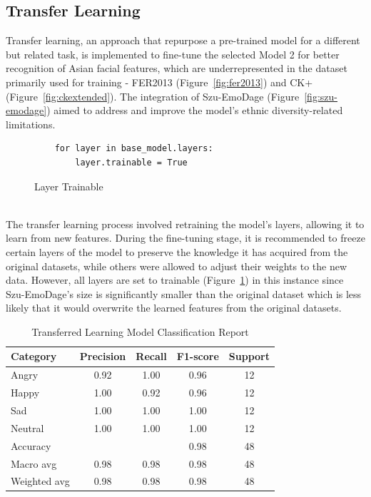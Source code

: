 \subsection{Transfer Learning}
Transfer learning, an approach that repurpose a pre-trained model for a different but related task, is implemented to fine-tune the selected Model 2 for better recognition of Asian facial features, which are underrepresented in the dataset primarily used for training - FER2013 (Figure~\ref{fig:fer2013}) and CK+ (Figure~\ref{fig:ckextended}).
The integration of Szu-EmoDage (Figure~\ref{fig:szu-emodage}) aimed to address and improve the model's ethnic diversity-related limitations.
\begin{figure}[ht!]
    \begin{verbatim}
    for layer in base_model.layers:
        layer.trainable = True 
    \end{verbatim}
    \caption{Layer Trainable}
    \label{fig:layer-trainable}
\end{figure}
\\
\indent The transfer learning process involved retraining the model's layers, allowing it to learn from new features.
During the fine-tuning stage, it is recommended to freeze certain layers of the model to preserve the knowledge it has acquired from the original datasets, while others were allowed to adjust their weights to the new data.
However, all layers are set to trainable (Figure~\ref{fig:layer-trainable}) in this instance since Szu-EmoDage's size is significantly smaller than the original dataset which is less likely that it would overwrite the learned features from the original datasets.
\begin{table}[H]
    \centering
    \renewcommand{\arraystretch}{1.5}
    \begin{tabular*}{\textwidth}{
        @{\extracolsep{\fill}}
        l
        S[table-format=1.2]
        S[table-format=1.2]
        S[table-format=1.2]
        S[table-format=4.0]
    }
      \toprule
      \textbf{Category} & {\textbf{Precision}} & {\textbf{Recall}} & {\textbf{F1-score}} & {\textbf{Support}} \\
      \midrule
      Angry & 0.92 & 1.00 & 0.96 & 12 \\
      Happy & 1.00 & 0.92 & 0.96 & 12 \\
      Sad & 1.00 & 1.00 & 1.00 & 12 \\
      Neutral & 1.00 & 1.00 & 1.00 & 12 \\
      \midrule
      Accuracy & & & 0.98 & 48 \\
      Macro avg & 0.98 & 0.98 & 0.98 & 48 \\
      Weighted avg & 0.98 & 0.98 & 0.98 & 48 \\
      \bottomrule
    \end{tabular*}
    \caption{Transferred Learning Model Classification Report}
    \label{tab:tf-class-report}
\end{table}
